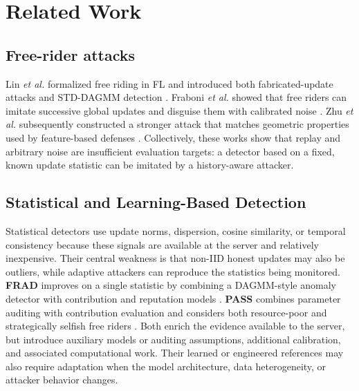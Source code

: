 \documentclass[conference]{IEEEtran}
\begin{document}
\section{Related Work}

\subsection{Free-rider attacks}
Lin \emph{et al.} formalized free riding in FL and introduced both fabricated-update attacks and STD-DAGMM detection \cite{lin2019freeriders}. Fraboni \emph{et al.} showed that free riders can imitate successive global updates and disguise them with calibrated noise \cite{fraboni2021freerider}. Zhu \emph{et al.} subsequently constructed a stronger attack that matches geometric properties used by feature-based defenses \cite{zhu2023advanced}. Collectively, these works show that replay and arbitrary noise are insufficient evaluation targets: a detector based on a fixed, known update statistic can be imitated by a history-aware attacker.

\subsection{Statistical and Learning-Based Detection}
Statistical detectors use update norms, dispersion, cosine similarity, or temporal consistency because these signals are available at the server and relatively inexpensive. Their central weakness is that non-IID honest updates may also be outliers, while adaptive attackers can reproduce the statistics being monitored. \textbf{FRAD} improves on a single statistic by combining a DAGMM-style anomaly detector with contribution and reputation models \cite{wang2024frad}. \textbf{PASS} combines parameter auditing with contribution evaluation and considers both resource-poor and strategically selfish free riders \cite{wang2023pass}. Both enrich the evidence available to the server, but introduce auxiliary models or auditing assumptions, additional calibration, and associated computational work. Their learned or engineered references may also require adaptation when the model architecture, data heterogeneity, or attacker behavior changes.
\end{document}
